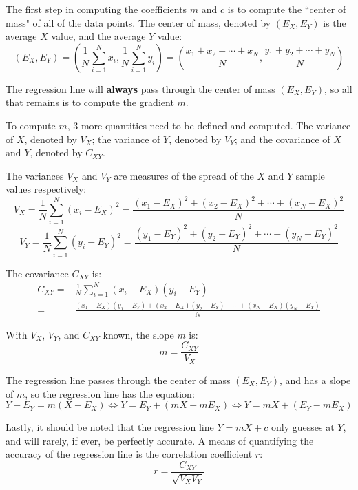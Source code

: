 \documentclass{article}
\begin{document}
The first step in computing the coefficients \(m\) and \(c\) is to compute the ``center of mass" of all of the data points. The center of mass, denoted by \((E_X, E_Y)\) is the average \(X\) value, and the average \(Y\) value:
\[(E_X, E_Y) = \left(\frac{1}{N}\sum_{i=1}^N x_i, \frac{1}{N}\sum_{i=1}^N y_i\right) = \left(\frac{x_1 + x_2 + \cdots + x_N}{N}, \frac{y_1 + y_2 + \cdots + y_N}{N}\right)\] 

The regression line will {\bf always} pass through the center of mass \((E_X, E_Y)\), so all that remains is to compute the gradient \(m\).

To compute \(m\), 3 more quantities need to be defined and computed. The variance of \(X\), denoted by \(V_X\); the variance of \(Y\), denoted by \(V_Y\); and the covariance of \(X\) and \(Y\), denoted by \(C_{XY}\).

The variances \(V_X\) and \(V_Y\) are measures of the spread of the \(X\) and \(Y\) sample values respectively:
\[V_X = \frac{1}{N}\sum_{i=1}^N (x_i - E_X)^2 = \frac{(x_1 - E_X)^2 + (x_2 - E_X)^2 + \cdots + (x_N - E_X)^2}{N}\]
\[V_Y = \frac{1}{N}\sum_{i=1}^N (y_i - E_Y)^2 = \frac{(y_1 - E_Y)^2 + (y_2 - E_Y)^2 + \cdots + (y_N - E_Y)^2}{N}\]

The covariance \(C_{XY}\) is:
\begin{align*}
C_{XY} = & \frac{1}{N}\sum_{i=1}^N (x_i - E_X)(y_i - E_Y) \\
= & \frac{(x_1 - E_X)(y_1 - E_Y) + (x_2 - E_X)(y_2 - E_Y) + \cdots + (x_N - E_X)(y_N - E_Y)}{N}
\end{align*}

With \(V_X\), \(V_Y\), and \(C_{XY}\) known, the slope \(m\) is:
\[m = \frac{C_{XY}}{V_X}\]

The regression line passes through the center of mass \((E_X, E_Y)\), and has a slope of \(m\), so the regression line has the equation:
\[Y - E_Y = m(X - E_X) \iff Y = E_Y + (mX - mE_X) \iff Y = mX + (E_Y - mE_X)\]  

Lastly, it should be noted that the regression line \(Y = mX + c\) only guesses at \(Y\), and will rarely, if ever, be perfectly accurate. A means of quantifying the accuracy of the regression line is the correlation coefficient \(r\):
\[r = \frac{C_{XY}}{\sqrt{V_X V_Y}}\] 
\end{document}
